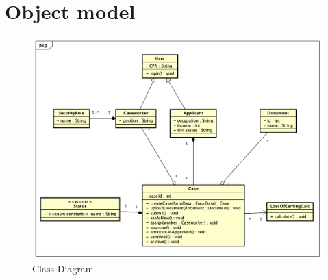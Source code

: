 \newpage
\section{Object model}
\begin{figure}[htb!]
    \centering
    \includegraphics[width=\textwidth]{img/class-diagram.png}
    \caption{Class Diagram}
\end{figure}